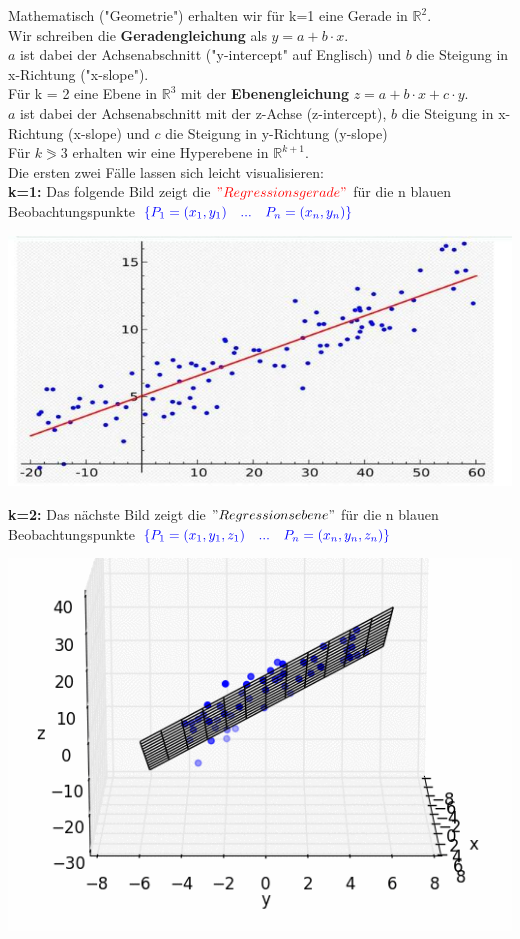 \documentclass[12pt]{article}
\begin{document}
Mathematisch ("Geometrie") erhalten wir für k=1 eine Gerade in $ \mathbb{R}^2 $. \\
%
Wir schreiben die \textbf{Geradengleichung} als $ y = a + b \cdot x $. \\
$a$ ist dabei der Achsenabschnitt ("y-intercept" auf Englisch) und $b$ die Steigung in x-Richtung ("x-slope").\\[0.2cm] 
%
Für k = 2 eine Ebene in $ \mathbb{R}^3$ mit der \textbf{Ebenengleichung} $ z  = a + b \cdot x  + c \cdot y $. \\
$a$ ist dabei der Achsenabschnitt mit der z-Achse (z-intercept), $b$ die Steigung in x-Richtung (x-slope) und $c$ die Steigung in y-Richtung (y-slope) \\[0.2cm] 
%
Für $k \eqslantgtr 3 $ erhalten wir eine Hyperebene in $ \mathbb{R}^{k+1}$.     \\[0.4cm]
%
Die ersten zwei Fälle lassen sich leicht visualisieren:\\[0.3cm] 
\textbf{k=1:} Das folgende Bild zeigt die $ \color{red}{"Regressionsgerade"} $ für die n blauen Beobachtungspunkte $ \color{blue}{\lbrace P_1 = (x_1,y_1)\quad...\quad P_n = (x_n,y_n) \rbrace } $
\\[0.2cm]
\hspace*{0.2cm}
\begin{center}
\includegraphics{sLR-Gerade} 
\end{center}
\textbf{k=2:} Das nächste Bild zeigt die $ \color{black}{"Regressionsebene"} $ für die n blauen Beobachtungspunkte $ \color{blue}{\lbrace P_1 = (x_1, y_1, z_1)\quad ... \quad P_n = (x_n, y_n, z_n)\rbrace } $
\begin{center}
\includegraphics{ML5-MovingPicture_mLR}\
\end{center} 
\end{document}

